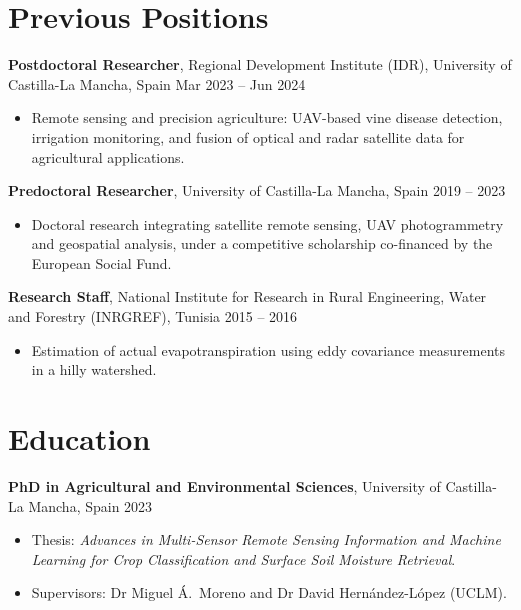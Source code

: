 \documentclass[10pt, a4paper]{article}
\newenvironment{highlights}{
    \begin{itemize}[
        topsep=0.10cm,
        parsep=0.10cm,
        partopsep=0pt,
        itemsep=0pt,
        leftmargin=0cm + 10pt
    ]
}{
    \end{itemize}
}
\begin{document}
\section{Previous Positions}

\textbf{Postdoctoral Researcher}, Regional Development Institute (IDR), University of Castilla-La Mancha, Spain \hfill Mar 2023 -- Jun 2024

\vspace{0.10cm}
\begin{highlights}
    \item Remote sensing and precision agriculture: UAV-based vine disease detection, irrigation monitoring, and fusion of optical and radar satellite data for agricultural applications.
\end{highlights}

\vspace{0.2cm}

\textbf{Predoctoral Researcher}, University of Castilla-La Mancha, Spain \hfill 2019 -- 2023

\vspace{0.10cm}
\begin{highlights}
    \item Doctoral research integrating satellite remote sensing, UAV photogrammetry and geospatial analysis, under a competitive scholarship co-financed by the European Social Fund.
\end{highlights}

\vspace{0.2cm}

\textbf{Research Staff}, National Institute for Research in Rural Engineering, Water and Forestry (INRGREF), Tunisia \hfill 2015 -- 2016

\vspace{0.10cm}
\begin{highlights}
    \item Estimation of actual evapotranspiration using eddy covariance measurements in a hilly watershed.
\end{highlights}

\section{Education}

\textbf{PhD in Agricultural and Environmental Sciences}, University of Castilla-La Mancha, Spain \hfill 2023

\vspace{0.10cm}
\begin{highlights}
    \item Thesis: \emph{Advances in Multi-Sensor Remote Sensing Information and Machine Learning for Crop Classification and Surface Soil Moisture Retrieval}.
    \item Supervisors: Dr Miguel Á.\ Moreno and Dr David Hernández-López (UCLM).
\end{highlights}
\end{document}
